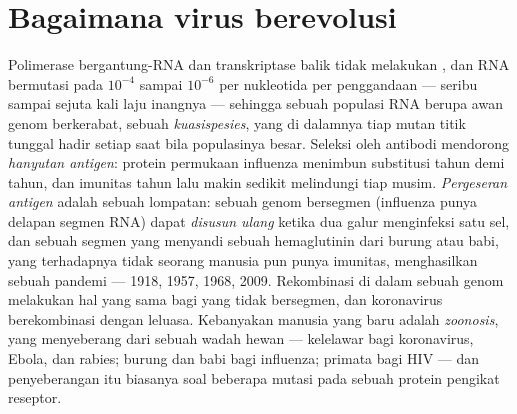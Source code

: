 \section{Bagaimana virus berevolusi}

\begin{definition}\label{def:b3:virology:evolution}
%
Polimerase bergantung-RNA dan transkriptase balik tidak melakukan ,
dan  RNA bermutasi pada $10^{-4}$ sampai $10^{-6}$ per nukleotida per
penggandaan --- seribu sampai sejuta kali laju inangnya --- sehingga sebuah
populasi  RNA berupa awan genom berkerabat, sebuah \emph{kuasispesies},
yang di dalamnya tiap mutan titik tunggal hadir setiap saat bila populasinya
besar. Seleksi oleh antibodi mendorong \emph{hanyutan antigen}: protein
permukaan influenza menimbun substitusi tahun demi tahun, dan imunitas tahun
lalu makin sedikit melindungi tiap musim. \emph{Pergeseran antigen} adalah
sebuah lompatan: sebuah genom bersegmen (influenza punya delapan segmen RNA)
dapat \emph{disusun ulang} ketika dua galur menginfeksi satu sel, dan sebuah
segmen yang menyandi sebuah hemaglutinin dari  burung atau babi, yang
terhadapnya tidak seorang manusia pun punya imunitas, menghasilkan sebuah
pandemi --- 1918, 1957, 1968, 2009. Rekombinasi di dalam sebuah genom melakukan
hal yang sama bagi  yang tidak bersegmen, dan koronavirus berekombinasi
dengan leluasa. Kebanyakan  manusia yang baru adalah \emph{zoonosis}, yang
menyeberang dari sebuah wadah hewan --- kelelawar bagi koronavirus, Ebola, dan
rabies; burung dan babi bagi influenza; primata bagi HIV --- dan penyeberangan
itu biasanya soal beberapa mutasi pada sebuah protein pengikat reseptor.
\end{definition}

